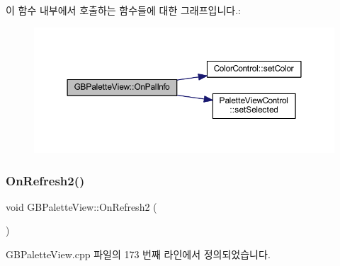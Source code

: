 이 함수 내부에서 호출하는 함수들에 대한 그래프입니다.\+:
\nopagebreak
\begin{figure}[H]
\begin{center}
\leavevmode
\includegraphics[width=350pt]{class_g_b_palette_view_a01960a28d93aef1873f5d5256fa11c79_cgraph}
\end{center}
\end{figure}
\mbox{\label{class_g_b_palette_view_a15d94f40712405e466296772b7087f3f}} 
\subsubsection{\texorpdfstring{On\+Refresh2()}{OnRefresh2()}}
{\footnotesize\ttfamily void G\+B\+Palette\+View\+::\+On\+Refresh2 (\begin{DoxyParamCaption}{ }\end{DoxyParamCaption})\hspace{0.3cm}{\ttfamily [protected]}}



G\+B\+Palette\+View.\+cpp 파일의 173 번째 라인에서 정의되었습니다.


